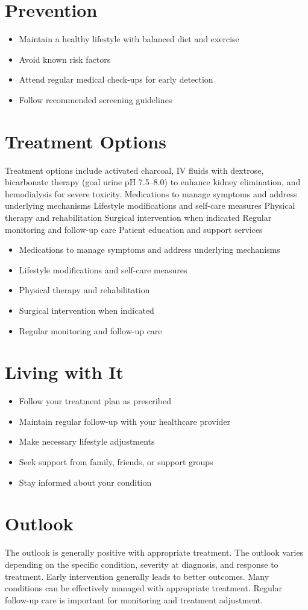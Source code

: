 \section{Prevention}
\begin{itemize}[noitemsep]
  \item Maintain a healthy lifestyle with balanced diet and exercise
  \item Avoid known risk factors
  \item Attend regular medical check-ups for early detection
  \item Follow recommended screening guidelines
\end{itemize}
\section{Treatment Options}
Treatment options include activated charcoal, IV fluids with dextrose, bicarbonate therapy (goal urine pH 7.5--8.0) to enhance kidney elimination, and hemodialysis for severe toxicity. Medications to manage symptoms and address underlying mechanisms Lifestyle modifications and self-care measures Physical therapy and rehabilitation Surgical intervention when indicated Regular monitoring and follow-up care Patient education and support services

\begin{itemize}[noitemsep]
  \item Medications to manage symptoms and address underlying mechanisms
  \item Lifestyle modifications and self-care measures
  \item Physical therapy and rehabilitation
  \item Surgical intervention when indicated
  \item Regular monitoring and follow-up care
\end{itemize}
\section{Living with It}
\begin{itemize}[noitemsep]
  \item Follow your treatment plan as prescribed
  \item Maintain regular follow-up with your healthcare provider
  \item Make necessary lifestyle adjustments
  \item Seek support from family, friends, or support groups
  \item Stay informed about your condition
\end{itemize}
\section{Outlook}
The outlook is generally positive with appropriate treatment. The outlook varies depending on the specific condition, severity at diagnosis, and response to treatment. Early intervention generally leads to better outcomes. Many conditions can be effectively managed with appropriate treatment. Regular follow-up care is important for monitoring and treatment adjustment.
